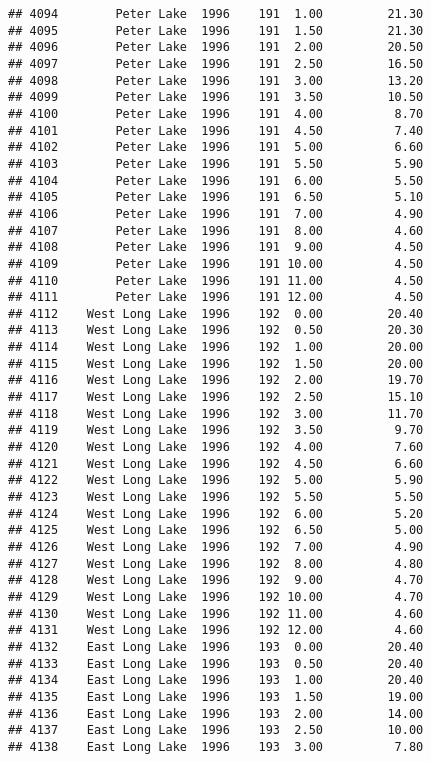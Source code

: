 \documentclass[
]{article}
\begin{document}
\begin{verbatim}
## 4094        Peter Lake  1996    191  1.00         21.30
## 4095        Peter Lake  1996    191  1.50         21.30
## 4096        Peter Lake  1996    191  2.00         20.50
## 4097        Peter Lake  1996    191  2.50         16.50
## 4098        Peter Lake  1996    191  3.00         13.20
## 4099        Peter Lake  1996    191  3.50         10.50
## 4100        Peter Lake  1996    191  4.00          8.70
## 4101        Peter Lake  1996    191  4.50          7.40
## 4102        Peter Lake  1996    191  5.00          6.60
## 4103        Peter Lake  1996    191  5.50          5.90
## 4104        Peter Lake  1996    191  6.00          5.50
## 4105        Peter Lake  1996    191  6.50          5.10
## 4106        Peter Lake  1996    191  7.00          4.90
## 4107        Peter Lake  1996    191  8.00          4.60
## 4108        Peter Lake  1996    191  9.00          4.50
## 4109        Peter Lake  1996    191 10.00          4.50
## 4110        Peter Lake  1996    191 11.00          4.50
## 4111        Peter Lake  1996    191 12.00          4.50
## 4112    West Long Lake  1996    192  0.00         20.40
## 4113    West Long Lake  1996    192  0.50         20.30
## 4114    West Long Lake  1996    192  1.00         20.00
## 4115    West Long Lake  1996    192  1.50         20.00
## 4116    West Long Lake  1996    192  2.00         19.70
## 4117    West Long Lake  1996    192  2.50         15.10
## 4118    West Long Lake  1996    192  3.00         11.70
## 4119    West Long Lake  1996    192  3.50          9.70
## 4120    West Long Lake  1996    192  4.00          7.60
## 4121    West Long Lake  1996    192  4.50          6.60
## 4122    West Long Lake  1996    192  5.00          5.90
## 4123    West Long Lake  1996    192  5.50          5.50
## 4124    West Long Lake  1996    192  6.00          5.20
## 4125    West Long Lake  1996    192  6.50          5.00
## 4126    West Long Lake  1996    192  7.00          4.90
## 4127    West Long Lake  1996    192  8.00          4.80
## 4128    West Long Lake  1996    192  9.00          4.70
## 4129    West Long Lake  1996    192 10.00          4.70
## 4130    West Long Lake  1996    192 11.00          4.60
## 4131    West Long Lake  1996    192 12.00          4.60
## 4132    East Long Lake  1996    193  0.00         20.40
## 4133    East Long Lake  1996    193  0.50         20.40
## 4134    East Long Lake  1996    193  1.00         20.40
## 4135    East Long Lake  1996    193  1.50         19.00
## 4136    East Long Lake  1996    193  2.00         14.00
## 4137    East Long Lake  1996    193  2.50         10.00
## 4138    East Long Lake  1996    193  3.00          7.80

\end{verbatim}
\end{document}
